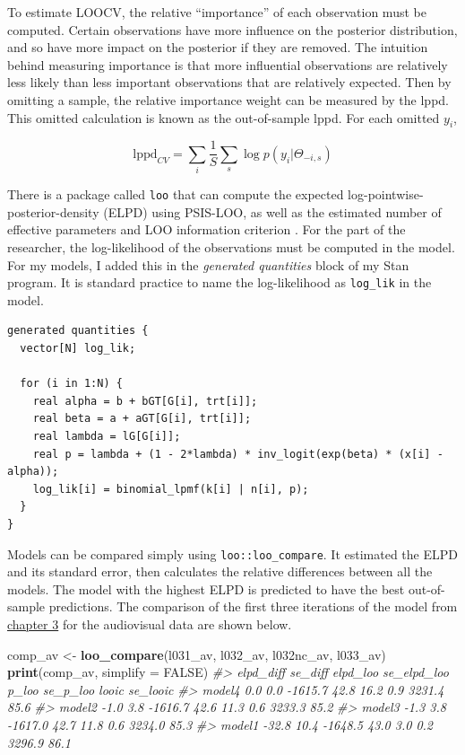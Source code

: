 \documentclass[11pt, oneside, openany]{scrbook}
\newenvironment{Shaded}{\begin{snugshade}}{\end{snugshade}}
\newcommand{\CommentTok}[1]{\textcolor[rgb]{0.56,0.35,0.01}{\textit{#1}}}
\newcommand{\DataTypeTok}[1]{\textcolor[rgb]{0.13,0.29,0.53}{#1}}
\newcommand{\KeywordTok}[1]{\textcolor[rgb]{0.13,0.29,0.53}{\textbf{#1}}}
\newcommand{\NormalTok}[1]{#1}
\newcommand{\OtherTok}[1]{\textcolor[rgb]{0.56,0.35,0.01}{#1}}
\newcommand{\StringTok}[1]{\textcolor[rgb]{0.31,0.60,0.02}{#1}}
\begin{document}
To estimate LOOCV, the relative ``importance'' of each observation must be computed. Certain observations have more influence on the posterior distribution, and so have more impact on the posterior if they are removed. The intuition behind measuring importance is that more influential observations are relatively less likely than less important observations that are relatively expected. Then by omitting a sample, the relative importance weight can be measured by the lppd. This omitted calculation is known as the out-of-sample lppd. For each omitted \(y_i\),

\[
\mathrm{lppd}_{CV} = \sum_i \frac{1}{S} \sum_s \log p(y_{i} | \Theta_{-i,s})
\]

There is a package called \texttt{loo} that can compute the expected log-pointwise-posterior-density (ELPD) using PSIS-LOO, as well as the estimated number of effective parameters and LOO information criterion \citep{R-loo}. For the part of the researcher, the log-likelihood of the observations must be computed in the model. For my models, I added this in the \emph{generated quantities} block of my Stan program. It is standard practice to name the log-likelihood as \texttt{log\_lik} in the model.

\begin{verbatim}
generated quantities {
  vector[N] log_lik;

  for (i in 1:N) {
    real alpha = b + bGT[G[i], trt[i]];
    real beta = a + aGT[G[i], trt[i]];
    real lambda = lG[G[i]];
    real p = lambda + (1 - 2*lambda) * inv_logit(exp(beta) * (x[i] - alpha));
    log_lik[i] = binomial_lpmf(k[i] | n[i], p);
  }
}
\end{verbatim}

Models can be compared simply using \texttt{loo::loo\_compare}. It estimated the ELPD and its standard error, then calculates the relative differences between all the models. The model with the highest ELPD is predicted to have the best out-of-sample predictions. The comparison of the first three iterations of the model from \protect\hyperlink{workflow}{chapter 3} for the audiovisual data are shown below.

\begin{Shaded}
\begin{Highlighting}[]
\NormalTok{comp_av <-}\StringTok{ }\KeywordTok{loo_compare}\NormalTok{(l031_av, l032_av, l032nc_av, l033_av)}
\KeywordTok{print}\NormalTok{(comp_av, }\DataTypeTok{simplify =} \OtherTok{FALSE}\NormalTok{)}
\CommentTok{#>        elpd_diff se_diff elpd_loo se_elpd_loo p_loo   se_p_loo looic   se_looic}
\CommentTok{#> model4     0.0       0.0 -1615.7     42.8        16.2     0.9   3231.4    85.6 }
\CommentTok{#> model2    -1.0       3.8 -1616.7     42.6        11.3     0.6   3233.3    85.2 }
\CommentTok{#> model3    -1.3       3.8 -1617.0     42.7        11.8     0.6   3234.0    85.3 }
\CommentTok{#> model1   -32.8      10.4 -1648.5     43.0         3.0     0.2   3296.9    86.1}
\end{Highlighting}
\end{Shaded}
\end{document}
